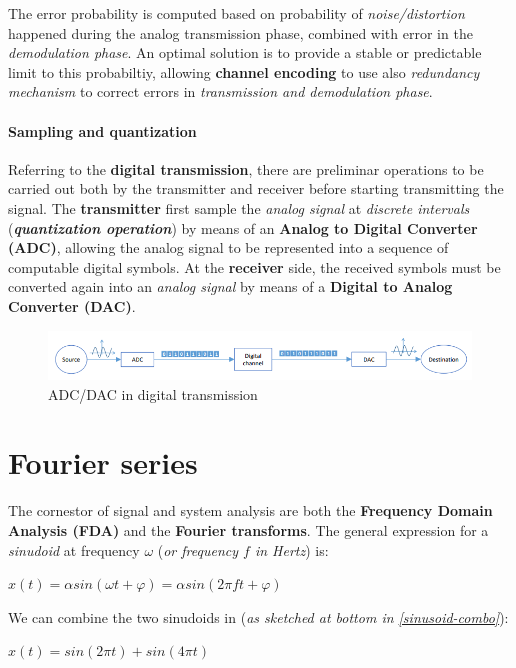 \documentclass[10pt,a4paper]{report}
\theoremstyle{definition}
\begin{document}
The error probability is computed based on probability of \textit{noise/distortion} happened during the analog transmission phase, combined with error in the \textit{demodulation phase}. An optimal solution is to provide a stable or predictable limit to this probabiltiy, allowing \textbf{channel encoding} to use also \textit{redundancy mechanism} to correct errors in \textit{transmission and demodulation phase}.
\paragraph{Sampling and quantization}\label{sec:sampling-and-quantization}
Referring to the \textbf{digital transmission}, there are preliminar operations to be carried out both by the transmitter and receiver before starting transmitting the signal.
The \textbf{transmitter} first sample the \textit{analog signal} at \textit{discrete intervals} (\textit{\textbf{quantization operation}}) by means of an \textbf{Analog to Digital Converter (ADC)}, allowing the analog signal to be represented into a sequence of computable digital symbols.
At the \textbf{receiver} side, the received symbols must be converted again into an \textit{analog signal} by means of a \textbf{Digital to Analog Converter (DAC)}.
\begin{figure}[h]
	\centering\includegraphics[scale=0.50]{images/Pasted image 20230505121537.png}
	\caption{ADC/DAC in digital transmission}
\end{figure}

\section{Fourier series}\label{sec:fourier-series}
The cornestor of signal and system analysis are both the \textbf{Frequency Domain Analysis (FDA)} and the \textbf{Fourier transforms}.
The general expression for a \textit{sinudoid} at frequency $\omega$ (\textit{or frequency $f$ in Hertz}) is:
\begin{center}
$x(t)=\alpha sin(\omega t + \varphi) = \alpha sin(2\pi ft + \varphi)$
\end{center}

We can combine the two sinudoids in (\textit{as sketched at bottom in \ref{sinusoid-combo}}):
\begin{center}
$x(t) = sin(2\pi t) + sin(4\pi t)$
\end{center}
\end{document}
